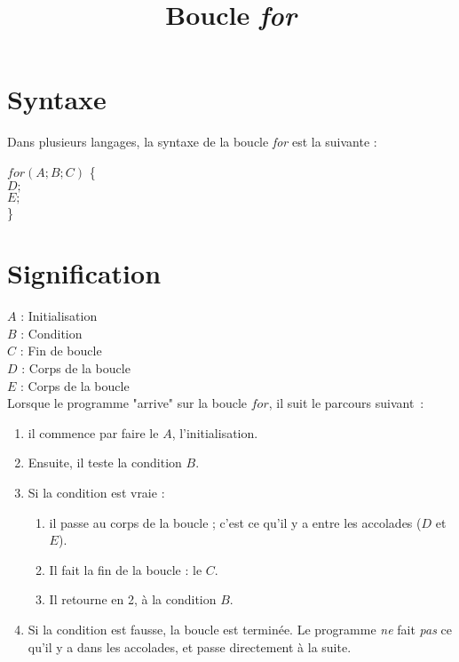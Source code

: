 \documentclass{article}
\title{Boucle \emph{for}}
\date{}
\begin{document}
	\maketitle
	\section{Syntaxe}	
	Dans plusieurs langages, la syntaxe de la boucle \emph{for} est la suivante :
	
	\begin{center}
		\begin{minipage}{0.3\textwidth}
			$for(A;B;C)$ \{\\
			\hspace*{20px} $D;$\\
			\hspace*{20px} $E;$\\
			\}
		\end{minipage}
	\end{center}
	
	\section{Signification}
	\noindent$A$ : Initialisation\\
	$B$ : Condition\\
	$C$ : Fin de boucle\\
	$D$ : Corps de la boucle\\
	$E$ : Corps de la boucle\\
	
	\noindent Lorsque le programme "arrive" sur la boucle $for$, il suit le parcours suivant~:
	
	\begin{enumerate}
		\item  il commence par faire le $A$, l'initialisation.
		\item Ensuite, il teste la condition $B$.
		\item Si la condition est vraie :
		\begin{enumerate}
			\item il passe au corps de la boucle ; c'est ce qu'il y a entre les accolades ($D$ et $E$).
			\item Il fait la fin de la boucle : le $C$.
			\item Il retourne en 2, à la condition $B$.
		\end{enumerate}
		\item Si la condition est fausse, la boucle est terminée. Le programme \emph{ne} fait \emph{pas} ce qu'il y a dans les accolades, et passe directement à la suite.
	\end{enumerate}
\end{document}
